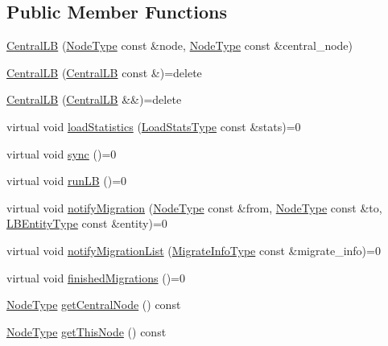 \subsection*{Public Member Functions}
\begin{DoxyCompactItemize}
\item 
\hyperlink{structvt_1_1lb_1_1centralized_1_1_central_l_b_a6d9fc1b18d9324ed7b4fde9b4402f362}{Central\+LB} (\hyperlink{namespacevt_a866da9d0efc19c0a1ce79e9e492f47e2}{Node\+Type} const \&node, \hyperlink{namespacevt_a866da9d0efc19c0a1ce79e9e492f47e2}{Node\+Type} const \&central\+\_\+node)
\item 
\hyperlink{structvt_1_1lb_1_1centralized_1_1_central_l_b_aa0fcbec516d85fc7fbdfe2ac436d3dc7}{Central\+LB} (\hyperlink{structvt_1_1lb_1_1centralized_1_1_central_l_b}{Central\+LB} const \&)=delete
\item 
\hyperlink{structvt_1_1lb_1_1centralized_1_1_central_l_b_a90c17141afbb48c0765891bad941a5cc}{Central\+LB} (\hyperlink{structvt_1_1lb_1_1centralized_1_1_central_l_b}{Central\+LB} \&\&)=delete
\item 
virtual void \hyperlink{structvt_1_1lb_1_1centralized_1_1_central_l_b_a6ff14c12979d3f7e34258640ac01df9c}{load\+Statistics} (\hyperlink{structvt_1_1lb_1_1centralized_1_1_central_l_b_aafbf9d4fbe90a3561fd812661c970b2d}{Load\+Stats\+Type} const \&stats)=0
\item 
virtual void \hyperlink{structvt_1_1lb_1_1centralized_1_1_central_l_b_a387d927741a5365094b21c988933e171}{sync} ()=0
\item 
virtual void \hyperlink{structvt_1_1lb_1_1centralized_1_1_central_l_b_a758e6e57f66a6ad143cef6156294c98d}{run\+LB} ()=0
\item 
virtual void \hyperlink{structvt_1_1lb_1_1centralized_1_1_central_l_b_af7a0204c9839ccf77a2fd724a2c9841c}{notify\+Migration} (\hyperlink{namespacevt_a866da9d0efc19c0a1ce79e9e492f47e2}{Node\+Type} const \&from, \hyperlink{namespacevt_a866da9d0efc19c0a1ce79e9e492f47e2}{Node\+Type} const \&to, \hyperlink{namespacevt_a92ec26fb6644cd0ba7eb0ee70c96bee5}{L\+B\+Entity\+Type} const \&entity)=0
\item 
virtual void \hyperlink{structvt_1_1lb_1_1centralized_1_1_central_l_b_a478778a92cd3a05b9aa4b2b417cb4a4b}{notify\+Migration\+List} (\hyperlink{structvt_1_1lb_1_1centralized_1_1_central_l_b_a8d393c0126180fb8cce2b881c23df44f}{Migrate\+Info\+Type} const \&migrate\+\_\+info)=0
\item 
virtual void \hyperlink{structvt_1_1lb_1_1centralized_1_1_central_l_b_af989072d4e6277bb8d1dfab6638a335d}{finished\+Migrations} ()=0
\item 
\hyperlink{namespacevt_a866da9d0efc19c0a1ce79e9e492f47e2}{Node\+Type} \hyperlink{structvt_1_1lb_1_1centralized_1_1_central_l_b_a5eea478088d9a7983df9d3acd02b3291}{get\+Central\+Node} () const
\item 
\hyperlink{namespacevt_a866da9d0efc19c0a1ce79e9e492f47e2}{Node\+Type} \hyperlink{structvt_1_1lb_1_1centralized_1_1_central_l_b_aaa17c1f34752528891b287df90809a72}{get\+This\+Node} () const
\end{DoxyCompactItemize}


